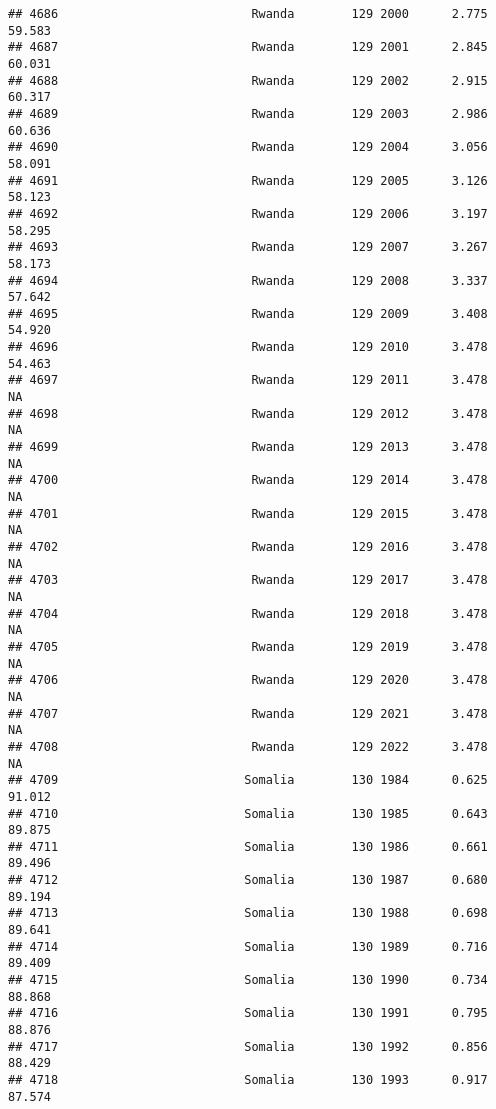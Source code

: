 \documentclass[
]{article}
\begin{document}
\begin{verbatim}
## 4686                           Rwanda        129 2000      2.775     59.583
## 4687                           Rwanda        129 2001      2.845     60.031
## 4688                           Rwanda        129 2002      2.915     60.317
## 4689                           Rwanda        129 2003      2.986     60.636
## 4690                           Rwanda        129 2004      3.056     58.091
## 4691                           Rwanda        129 2005      3.126     58.123
## 4692                           Rwanda        129 2006      3.197     58.295
## 4693                           Rwanda        129 2007      3.267     58.173
## 4694                           Rwanda        129 2008      3.337     57.642
## 4695                           Rwanda        129 2009      3.408     54.920
## 4696                           Rwanda        129 2010      3.478     54.463
## 4697                           Rwanda        129 2011      3.478         NA
## 4698                           Rwanda        129 2012      3.478         NA
## 4699                           Rwanda        129 2013      3.478         NA
## 4700                           Rwanda        129 2014      3.478         NA
## 4701                           Rwanda        129 2015      3.478         NA
## 4702                           Rwanda        129 2016      3.478         NA
## 4703                           Rwanda        129 2017      3.478         NA
## 4704                           Rwanda        129 2018      3.478         NA
## 4705                           Rwanda        129 2019      3.478         NA
## 4706                           Rwanda        129 2020      3.478         NA
## 4707                           Rwanda        129 2021      3.478         NA
## 4708                           Rwanda        129 2022      3.478         NA
## 4709                          Somalia        130 1984      0.625     91.012
## 4710                          Somalia        130 1985      0.643     89.875
## 4711                          Somalia        130 1986      0.661     89.496
## 4712                          Somalia        130 1987      0.680     89.194
## 4713                          Somalia        130 1988      0.698     89.641
## 4714                          Somalia        130 1989      0.716     89.409
## 4715                          Somalia        130 1990      0.734     88.868
## 4716                          Somalia        130 1991      0.795     88.876
## 4717                          Somalia        130 1992      0.856     88.429
## 4718                          Somalia        130 1993      0.917     87.574

\end{verbatim}
\end{document}
